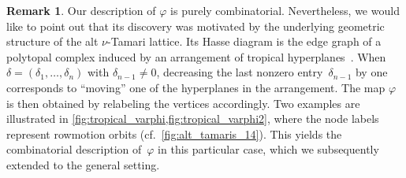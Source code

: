 \documentclass[11pt]{amsart}
\theoremstyle{definition}
\newtheorem{remark}[theorem]{Remark}
\begin{document}
\begin{remark}
Our description of $\varphi$ is purely combinatorial. Nevertheless, we would like to point out that its discovery was motivated by the underlying geometric structure of the alt $\nu$-Tamari lattice. Its Hasse diagram is the edge graph of a polytopal complex induced by an arrangement of tropical hyperplanes~\cite{ceballos2024canonical}. When $\delta=(\delta_1,\dots,\delta_n)$ with $\delta_{n-1}\neq 0$, decreasing the last nonzero entry~$\delta_{n-1}$ by one corresponds to ``moving'' one of the hyperplanes in the arrangement. The map $\varphi$ is then obtained by relabeling the vertices accordingly. Two examples are illustrated in \cref{fig:tropical_varphi,fig:tropical_varphi2}, where the node labels represent rowmotion orbits (cf.~\cref{fig:alt_tamaris_14}). This yields the combinatorial description of~$\varphi$ in this particular case, which we subsequently extended to the general setting.
\end{remark}
\end{document}
